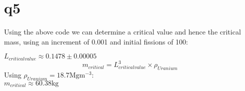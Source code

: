 \documentclass[a4paper,english]{article}
\begin{document}
    \section{q5}
    Using the above code we can determine a critical value and hence the critical mass, using an increment of 0.001 and initial fissions of 100:
    \begin{center}
        $L_{criticalvalue} \approx 0.1478 \pm 0.00005$\\
        \begin{equation*}
            m_{critical} = L_{criticalvalue}^3 \times \rho_{Uranium}
        \end{equation*}
    Using $\rho_{Uranium} = 18.7\textrm{Mgm$^{-3}$}$:\\
        $m_{critical} \approx 60.38\textrm{kg}$
    \end{center}
\end{document}
